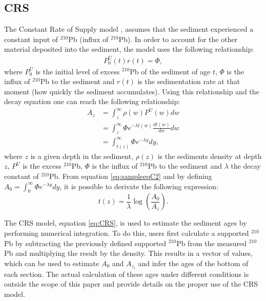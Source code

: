 \documentclass [10pt] {article}
\begin{document}


\subsection{CRS}


The Constant Rate of Supply model \citep{Appleby1978,Appleby1998,Appleby2001,Appleby2008}, assumes that the sediment experienced a constant input of $^{210}$Pb (influx of $^{210}$Pb). In order to account for the other material deposited into the sediment, the model uses the following relationship:
\begin{eqnarray}
	P_0^U(t)r(t) = \Phi,
\end{eqnarray}
where $P_0^U$ is the initial level of excess $^{210}$Pb of the sediment of age $t$, $\Phi$ is the influx of $^{210}$Pb to the sediment and $r(t)$ is the sedimentation rate at that moment (how quickly the sediment accumulates). Using this relationship and the decay equation one can reach the following relationship:
\begin{eqnarray}
	A_{z}&=\int_{z}^{\infty}\rho(w)P^U(w)dw  \nonumber \\
	&=\int_{z}^{\infty} \Phi e^{- \lambda t(w) }\frac{dt(w)}{dw} dw \nonumber \\ 
	&=\int_{t(z)}^{\infty} \Phi e^{- \lambda y } dy,  \label{eq:sampleeqC2} 
\end{eqnarray}
where $z$ is a given depth in the sediment, $\rho(z)$ is the sediments density at depth $z$, $P^U$ is the excess $^{210}$Pb, $\Phi$ is the influx of $^{210}$Pb to the sediment and $\lambda$ the decay constant of $^{210}$Pb. From equation \ref{eq:sampleeqC2} and by defining $A_0=\int_{0}^{\infty} \Phi e^{- \lambda y } dy$, it is possible to derivate the following expression:
\begin{equation}
	t(z)= \frac{1}{\lambda}\log\left(\frac{A_0}{A_{z}}\right). \label{eq:CRS}
\end{equation}

The CRS model, equation \ref{eq:CRS}, is used to estimate the sediment ages by performing numerical integration. To do this, users first calculate a supported $^{210}$Pb by subtracting the previously defined supported $^{210}$Pb from the measured $^{210}$Pb and multiplying the result by the density. This results in a vector of values, which can be used to estimate $A_0$ and $A_{z_i}$ and infer the ages of the bottom of each section. The actual calculation of these ages under different conditions is outside the scope of this paper and \citet{Sanchez-Cabeza2012} provide details on the proper use of the CRS model.
\end{document}
